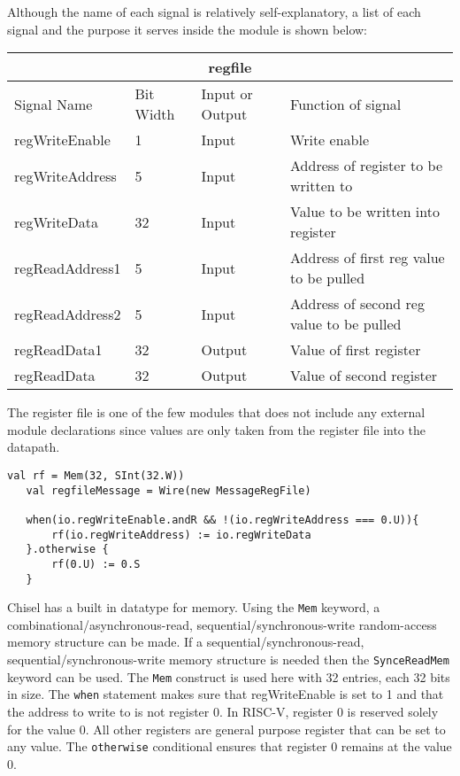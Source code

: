 \documentclass[12pt, letterpaper]{report}
\begin{document}
\noindent Although the name of each signal is relatively self-explanatory, a list of each signal and the purpose it serves inside the module is shown below: \newline
\begin{tabular}{ |p{3cm}|p{1cm}|p{2cm}|p{7cm}|  }
   \hline
   \multicolumn{4}{|c|}{regfile} \\
   \hline
   Signal Name & Bit Width & Input or Output & Function of signal\\
   \hline
   regWriteEnable	& 1   & Input  & Write enable\\
   regWriteAddress  & 5   & Input  & Address of register to be written to\\
   regWriteData     & 32  & Input  & Value to be written into register\\
   regReadAddress1  & 5   & Input  & Address of first reg value to be pulled\\
   regReadAddress2  & 5   & Input  & Address of second reg value to be pulled\\
   regReadData1     & 32  & Output & Value of first register\\
   regReadData      & 32  & Output & Value of second register\\
   \hline
  \end{tabular}

The register file is one of the few modules that does not include any external module declarations since values are only taken from the register file into the datapath.


\begin{lstlisting}[style=scala]
   val rf = Mem(32, SInt(32.W))
   val regfileMessage = Wire(new MessageRegFile)
   
   when(io.regWriteEnable.andR && !(io.regWriteAddress === 0.U)){
	   rf(io.regWriteAddress) := io.regWriteData
   }.otherwise {
	   rf(0.U) := 0.S
   }
\end{lstlisting}

\noindent Chisel has a built in datatype for memory.
Using the \verb|Mem| keyword, a combinational/asynchronous-read,  sequential/synchronous-write random-access memory structure can be made.
If a sequential/synchronous-read, sequential/synchronous-write memory structure is needed then the \verb|SynceReadMem| keyword can be used.
The \verb|Mem| construct is used here with 32 entries, each 32 bits in size.
The \verb|when| statement makes sure that regWriteEnable is set to 1 and that the address to write to is not register 0.
In RISC-V, register 0 is reserved solely for the value 0.
All other registers are general purpose register that can be set to any value. 
The \verb|otherwise| conditional ensures that register 0 remains at the value 0.
\end{document}

